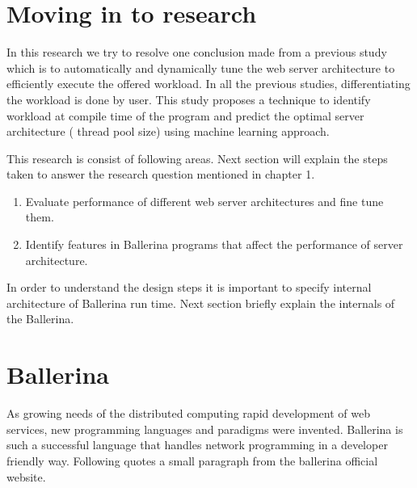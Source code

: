 \section{Moving in to research}

In this research we try to resolve one conclusion made from a previous study \cite{comp_ac} which is to automatically and dynamically tune the web server architecture to efficiently execute the offered workload. In all the previous studies, differentiating the workload is done by user. This study proposes a technique to identify workload at compile time of the program and predict the optimal server architecture ( thread pool size) using machine learning approach. 

This research is consist of following areas. Next section will explain the steps taken to answer the research question mentioned in chapter 1.

\begin{enumerate}
	\item Evaluate performance of different web server architectures and fine tune them.
	\item Identify features in Ballerina programs that affect the performance of server architecture.
\end{enumerate}

In order to understand the design steps it is important to specify internal architecture of Ballerina run time. Next section briefly explain the internals of the Ballerina.

\section{Ballerina}\label{Sec_Ballerina}

As growing needs of the distributed computing rapid development of web services, new programming languages and paradigms were invented. Ballerina \cite{ballerina} is such a successful language that handles network programming in a developer friendly way. Following quotes a small paragraph from the ballerina official website.





